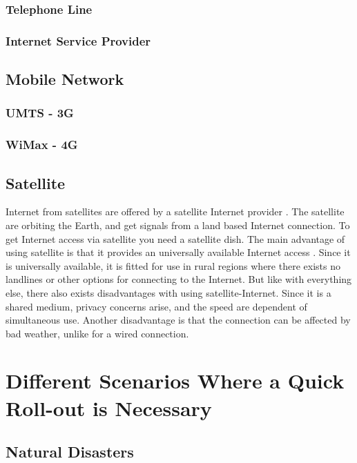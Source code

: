 \subsubsection{Telephone Line}
\subsubsection{Internet Service Provider}

\subsection{Mobile Network}
\subsubsection{UMTS - 3G}
\subsubsection{WiMax - 4G}

\subsection{Satellite}
Internet from satellites are offered by a satellite Internet provider \cite{cablevssatellite}. The satellite are orbiting the Earth, and get signals from a land based Internet connection. To get Internet access via satellite you need a satellite dish. The main advantage of using satellite is that it provides an universally available Internet access \cite{broadband}. Since it is universally available, it is fitted for use in rural regions where there exists no landlines or other options for connecting to the Internet. But like with everything else, there also exists disadvantages with using satellite-Internet. Since it is a shared medium, privacy concerns arise, and the speed are dependent of simultaneous use. Another disadvantage is that the connection can be affected by bad weather, unlike for a wired connection.

\section{Different Scenarios Where a Quick Roll-out is Necessary}

\subsection{Natural Disasters}

